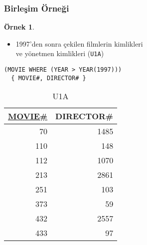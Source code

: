 \documentclass[dvipsnames]{beamer}
\theoremstyle{definition}
\theoremstyle{example}
\newtheorem{ornek}[theorem]{Örnek}
\theoremstyle{plain}
\begin{document}
\begin{frame}[fragile]
  \frametitle{Birleşim Örneği}

  \begin{ornek}
    \begin{itemize}
      \item 1997'den sonra çekilen filmlerin kimlikleri\\
        ve yönetmen kimlikleri (\texttt{U1A})
    \end{itemize}

    \begin{lstlisting}
(MOVIE WHERE (YEAR > YEAR(1997)))
  { MOVIE#, DIRECTOR# }
    \end{lstlisting}

    \pause
    \vspace{-10pt}
    \begin{tiny}
    \begin{table}
      \caption{U1A}
      \begin{tabular}{|r|r|}\hline
\underline{MOVIE\#} & DIRECTOR\#\\[2pt]\hline\hline
 70 &       1485\\\hline
110 &        148\\\hline
112 &       1070\\\hline
213 &       2861\\\hline
251 &        103\\\hline
373 &         59\\\hline
432 &       2557\\\hline
433 &         97\\\hline
      \end{tabular}
    \end{table}
    \end{tiny}
  \end{ornek}
\end{frame}
\end{document}
